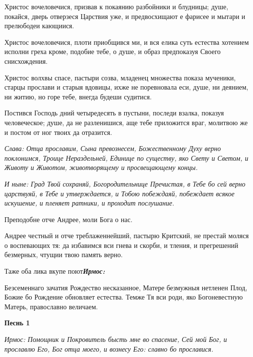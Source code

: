 Христос вочеловечися, призвав к покаянию разбойники и блудницы; душе, покайся, дверь отверзеся Царствия уже, и предвосхищают е фарисее и мытари и прелюбодеи кающиися. 

Христос вочеловечися, плоти приобщився ми, и вся елика суть естества хотением исполни греха кроме, подобие тебе, о душе, и образ предпоказуя Своего снисхождения. 

Христос волхвы спасе, пастыри созва, младенец множества показа мученики, старцы прослави и старыя вдовицы, ихже не поревновала еси, душе, ни деянием, ни житию, но горе тебе, внегда будеши судитися. 

Постився Господь дний четыредесять в пустыни, последи взалка, показуя человеческое; душе, да не разленишися, аще тебе приложится враг, молитвою же и постом от ног твоих да отразится. 

\itshape Слава\normalfont{}: Отца прославим, Сына превознесем, Божественному Духу верно поклонимся, Троице Нераздельней, Единице по существу, яко Свету и Светом, и Животу и Животом, животворящему и просвещающему концы. 

\itshape И ныне\normalfont{}: Град Твой сохраняй, Богородительнице Пречистая, в Тебе бо сей верно царствуяй, в Тебе и утверждается, и Тобою побеждаяй, побеждает всякое искушение, и пленяет ратники, и проходит послушание. 

\bfseries 

Преподобне отче Андрее, моли Бога о нас.

\normalfont{}

Андрее честный и отче треблаженнейший, пастырю Критский, не престай моляся о воспевающих тя: да избавимся вси гнева и скорби, и тления, и прегрешений безмерных, чтущии твою память верно. 

Таже оба лика вкупе поют\bfseries  \normalfont{}\itshape Ирмос: 

\normalfont{}Безсеменнаго зачатия Рождество несказанное, Матере безмужныя нетленен Плод, Божие бо Рождение обновляет естества. Темже Тя вси роди, яко Богоневестную Матерь, православно величаем. 

\mychapterending

 
\bfseries Песнь 1\normalfont{}

\itshape Ирмос\normalfont{}: Помощник и Покровитель бысть мне во спасение, Сей мой Бог, и прославлю Его, Бог отца моего, и вознесу Его: славно бо прославися. 

